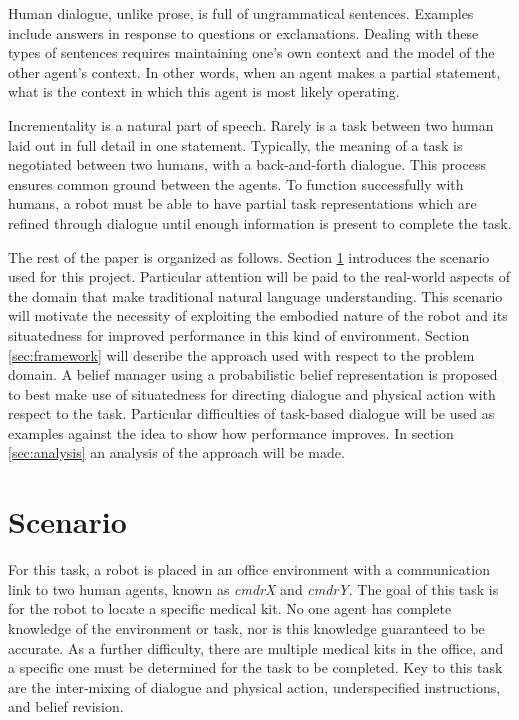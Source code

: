 \documentclass[12pt]{article}
\begin{document}
Human dialogue, unlike prose, is full of ungrammatical
sentences. Examples include answers in response to questions or
exclamations. Dealing with these types of sentences requires
maintaining one's own context and the model of the other agent's
context. In other words, when an agent makes a partial statement, what
is the context in which this agent is most likely operating. 

Incrementality is a natural part of speech. Rarely is a task between
two human laid out in full detail in one statement. Typically, the
meaning of a task is negotiated between two humans, with a
back-and-forth dialogue. This process ensures common ground between
the agents. To function successfully with humans, a robot must be able
to have partial task representations which are refined through
dialogue until enough information is present to complete the task.

The rest of the paper is organized as follows. Section
\ref{sec:scenario} introduces the scenario used for this
project. Particular attention will be paid to the real-world aspects
of the domain that make traditional natural language
understanding. This scenario will motivate the necessity of exploiting
the embodied nature of the robot and its situatedness for improved
performance in this kind of environment. Section \ref{sec:framework}
will describe the approach used with respect to the problem domain. A
belief manager using a probabilistic belief representation is proposed
to best make use of situatedness for directing dialogue and physical
action with respect to the task.  Particular difficulties of
task-based dialogue will be used as examples against the idea to show
how performance improves. In section \ref{sec:analysis} an analysis of
the approach will be made.

\section{Scenario}
\label{sec:scenario}
For this task, a robot is placed in an office environment with a
communication link to two human agents, known as \textit{cmdrX} and
\textit{cmdrY}. The goal of this task is for the robot to locate a
specific medical kit. No one agent has complete knowledge of the
environment or task, nor is this knowledge guaranteed to be accurate.
As a further difficulty, there are multiple medical kits in the
office, and a specific one must be determined for the task to be
completed. Key to this task are the inter-mixing of dialogue and
physical action, underspecified instructions, and belief revision.
\end{document}
